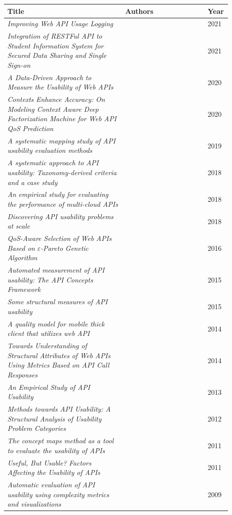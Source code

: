 \documentclass[12pt]{article}
\begin{document}
	\begin{table}
		\centering
		{\footnotesize \begin{tabular}{p{0.5\linewidth}p{0.35\linewidth}p{0.05\linewidth}} %
			\hline
			\textbf{Title} & \textbf{Authors} & \textbf{Year}\\
			\hline
			\textit{Improving Web API Usage Logging} & \cite{SMS-A14} & 2021\\
			\hline
			\textit{Integration of RESTFul API to Student Information System for Secured Data Sharing and Single Sign-on} & \cite{SMS-A3} & 2021\\
			\hline
			\textit{A Data-Driven Approach to Measure the Usability of Web APIs} & \cite{SMS-A4} & 2020\\
			\hline
			\textit{Contexts Enhance Accuracy: On Modeling Context Aware Deep Factorization Machine for Web API QoS Prediction} & \cite{SMS-A2} & 2020\\
			\hline
			\textit{A systematic mapping study of API usability evaluation methods} & \cite{SMS-A9} & 2019\\
			\hline
			\textit{A systematic approach to API usability: Taxonomy-derived criteria and a case study} & \cite{SMS-A8} & 2018\\
			\hline
			\textit{An empirical study for evaluating the performance of multi-cloud APIs} & \cite{SMS-A5} & 2018\\
			\hline
			\textit{Discovering API usability problems at scale} & \cite{SMS-A13} & 2018\\
			\hline
			\textit{QoS-Aware Selection of Web APIs Based on $\varepsilon$-Pareto Genetic Algorithm} & \cite{SMS-A6} & 2016\\
			\hline
			\textit{Automated measurement of API usability: The API Concepts Framework} & \cite{SMS-A11} & 2015\\
			\hline
			\textit{Some structural measures of API usability} & \cite{SMS-A16} & 2015\\
			\hline
			\textit{A quality model for mobile thick client that utilizes web API} & \cite{SMS-A1} & 2014\\
			\hline
			\textit{Towards Understanding of Structural Attributes of Web APIs Using Metrics Based on API Call Responses} & \cite{SMS-A7} & 2014\\
			\hline
			\textit{An Empirical Study of API Usability} & \cite{SMS-A10} & 2013\\
			\hline
			\textit{Methods towards API Usability: A Structural Analysis of Usability Problem Categories} & \cite{SMS-A15} & 2012\\
			\hline
			\textit{The concept maps method as a tool to evaluate the usability of APIs} & \cite{SMS-A17} & 2011\\
			\hline
			\textit{Useful, But Usable? Factors Affecting the Usability of APIs} & \cite{SMS-A18} & 2011\\
			\hline
			\textit{Automatic evaluation of API usability using complexity metrics and visualizations} & \cite{SMS-A12} & 2009\\
			\hline
		\end{tabular}}
		

\end{table}
\end{document}
